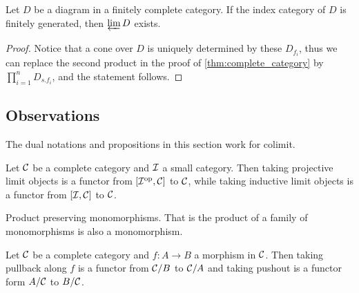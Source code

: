   \begin{prop}\label{prop:finitely generated limits}
    Let $D$ be a diagram in a finitely complete category. If the index category of $D$ is finitely generated, then $\operatorname*{\underleftarrow{\lim}} D$ exists.
  \end{prop}
  \begin{proof}
    Notice that a cone over $D$ is uniquely determined by these $D_{f_i}$, thus we can replace the second product in the proof of \ref{thm:complete_category} by $\prod\limits_{i=1}^n D_{s.f_i}$, and the statement follows.
  \end{proof}

\subsection{Observations}
  \begin{ex}
    The dual notations and propositions in this section work for colimit.
  \end{ex}
  \begin{ex}
    Let ${\cal C}$ be a complete category and ${\cal I}$ a small category. Then taking projective limit objects is a functor from $[{\cal I}^{\operatorname{op}},{\cal C}]$ to ${\cal C}$, while taking inductive limit objects is a functor from $[{\cal I},{\cal C}]$ to ${\cal C}$.
  \end{ex}
  \begin{ex}
    Product preserving monomorphisms. That is the product of a family of monomorphisms is also a monomorphism.
  \end{ex}
  \begin{ex}
    Let ${\cal C}$ be a complete category and $f\colon A\to B$ a morphism in ${\cal C}$. Then taking pullback along $f$ is a functor from ${\cal C}/B$ to ${\cal C}/A$ and taking pushout is a functor form $A/{\cal C}$ to $B/{\cal C}$.
  \end{ex}


